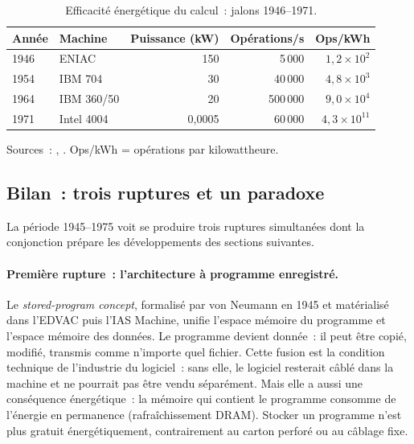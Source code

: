 \begin{table}[htbp]
\caption{Efficacité énergétique du calcul~: jalons 1946--1971.}\label{tab:efficacite-calcul}
\centering\small
\renewcommand{\arraystretch}{1.15}
\begin{tabular}{@{}llrrr@{}}
\toprule
\textbf{Année} & \textbf{Machine} & \textbf{Puissance (kW)} & \textbf{Opérations/s} & \textbf{Ops/kWh} \\
\midrule
1946 & ENIAC & 150 & 5\,000 & $1{,}2 \times 10^{2}$ \\
1954 & IBM 704 & 30 & 40\,000 & $4{,}8 \times 10^{3}$ \\
1964 & IBM 360/50 & 20 & 500\,000 & $9{,}0 \times 10^{4}$ \\
1971 & Intel 4004 & 0,0005 & 60\,000 & $4{,}3 \times 10^{11}$ \\
\bottomrule
\end{tabular}
\renewcommand{\arraystretch}{1.0}
\par\smallskip
\footnotesize Sources~: \textcite{nordhaus_two_2007}, \textcite{koomey_implications_2011}. Ops/kWh = opérations par kilowattheure.
\end{table}



\subsection{Bilan~: trois ruptures et un paradoxe}\label{subsec:bilan_computing}

%
La période 1945--1975 voit se produire trois ruptures simultanées dont la conjonction prépare les développements des sections suivantes.

\paragraph{Première rupture~: l'architecture à programme enregistré.} Le \emph{stored-program concept}, formalisé par von Neumann en 1945 et matérialisé dans l'EDVAC puis l'IAS Machine, unifie l'espace mémoire du programme et l'espace mémoire des données. Le programme devient donnée~: il peut être copié, modifié, transmis comme n'importe quel fichier. Cette fusion est la condition technique de l'industrie du logiciel~: sans elle, le logiciel resterait câblé dans la machine et ne pourrait pas être vendu séparément. Mais elle a aussi une conséquence énergétique~: la mémoire qui contient le programme consomme de l'énergie en permanence (rafraîchissement DRAM). Stocker un programme n'est plus gratuit énergétiquement, contrairement au carton perforé ou au câblage fixe.

